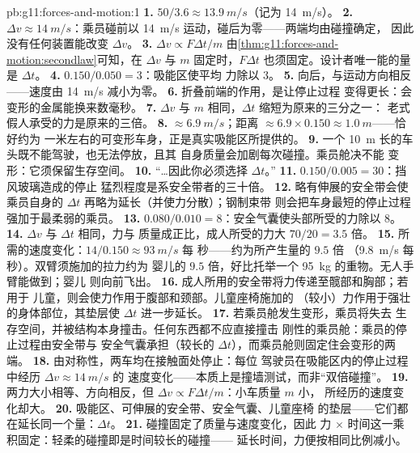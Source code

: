 \begin{solution}{pb:g11:forces-and-motion:1}
\textbf{1.} $50/3.6 \approx \qty{13.9}{m/s}$（记为 \qty{14}{m/s}）。
\textbf{2.} $\Delta v \approx \qty{14}{m/s}$：乘员碰前以
\qty{14}{m/s} 运动，碰后为零——两端均由碰撞确定，
因此没有任何装置能改变 $\Delta v$。
\textbf{3.} $\Delta v \propto F\Delta t/m$
由\cref{thm:g11:forces-and-motion:secondlaw}可知，在 $\Delta v$ 与 $m$
固定时，$F\Delta t$ 也须固定。设计者唯一能的量是
$\Delta t$。
\textbf{4.} $0.150/0.050 = 3$：吸能区使平均
力除以 $3$。
\textbf{5.} 向后，与运动方向相反——速度由
\qty{14}{m/s} 减小为零。
\textbf{6.} 折叠前端的作用，是让停止过程
变得更长：会变形的金属能换来数毫秒。
\textbf{7.} $\Delta v$ 与 $m$ 相同，$\Delta t$ 缩短为原来的三分之一：
老式假人承受的力是原来的三倍。
\textbf{8.}  $\approx \qty{6.9}{m/s}$；距离 $\approx
6.9 \times 0.150 \approx \qty{1.0}{m}$——恰好约为
一米左右的可变形车身，正是真实吸能区所提供的。
\textbf{9.} 一个 \qty{10}{m} 长的车头既不能驾驶，也无法停放，且其
自身质量会加剧每次碰撞。乘员舱决不能
变形：它须保留生存空间。
\textbf{10.} “\dots 因此你必须选择 $\Delta t$。”
\textbf{11.} $0.150/0.005 = 30$：挡风玻璃造成的停止
猛烈程度是系安全带者的三十倍。
\textbf{12.} 略有伸展的安全带会使乘员自身的
$\Delta t$ 再略为延长（并使力分散）；钢制束带
则会把车身最短的停止过程强加于最柔弱的乘员。
\textbf{13.} $0.080/0.010 = 8$：安全气囊使头部所受的力除以
$8$。
\textbf{14.} $\Delta v$ 与 $\Delta t$ 相同，力与
质量成正比，成人所受的力大 $70/20 = 3.5$ 倍。
\textbf{15.} 所需的速度变化：$14/0.150 \approx \qty{93}{m/s}$ 每
秒——约为所产生量的 $9.5$ 倍
（\qty{9.8}{m/s} 每秒）。双臂须施加的拉力约为
婴儿的 $9.5$ 倍，好比托举一个 \qty{95}{kg} 的重物。无人手臂能做到；婴儿
则向前飞出。
\textbf{16.} 成人所用的安全带将力传递至髋部和胸部；若用于
儿童，则会使力作用于腹部和颈部。儿童座椅施加的
（较小）力作用于强壮的身体部位，其垫层使
$\Delta t$ 进一步延长。
\textbf{17.} 若乘员舱发生变形，乘员将失去
生存空间，并被结构本身撞击。任何东西都不应直接撞击
刚性的乘员舱：乘员的停止过程由安全带与
安全气囊承担（较长的 $\Delta t$），而乘员舱则固定住会变形的两端。
\textbf{18.} 由对称性，两车均在接触面处停止：每位
驾驶员在吸能区内的停止过程中经历 $\Delta v \approx \qty{14}{m/s}$ 的
速度变化——本质上是撞墙测试，而非“双倍碰撞”。
\textbf{19.} 两力大小相等、方向相反，但
$\Delta v \propto F\Delta t/m$：小车质量 $m$ 小，
所经历的速度变化却大。
\textbf{20.} 吸能区、可伸展的安全带、安全气囊、儿童座椅
的垫层——它们都在延长同一个量：$\Delta t$。
\textbf{21.} 碰撞固定了质量与速度变化，因此
力 $\times$ 时间这一乘积固定：轻柔的碰撞即是时间较长的碰撞——
延长时间，力便按相同比例减小。
\end{solution}
